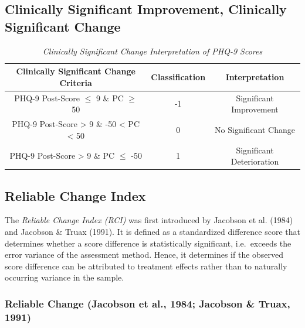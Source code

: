\documentclass[12pt,twoside]{reedthesis}
\begin{document}
\hypertarget{clinically-significant-improvement-clinically-significant-change}{%
\subsection{Clinically Significant Improvement, Clinically Significant Change}\label{clinically-significant-improvement-clinically-significant-change}}
\begin{table}[htb]
\vspace*{1.5em}
\begin{threeparttable}
  \caption{\textit{Clinically Significant Change Interpretation of PHQ-9 Scores}}
  \label{tab:csi-int}
  \begin{tabular}{@{}ccc@{}}
  \toprule
  Clinically Significant Change Criteria & Classification & Interpretation\\ \midrule
  PHQ-9 Post-Score $\leq$ 9 \& PC $\geq$ 50 & -1 & Significant Improvement\\
  PHQ-9 Post-Score > 9 \& -50 < PC < 50 & 0 & No Significant Change\\
  PHQ-9 Post-Score > 9 \& PC $\leq$ -50 & 1 & Significant Deterioration\\
  \bottomrule
  \end{tabular}
\end{threeparttable}
\end{table}
\hypertarget{reliable-change-index}{%
\subsection{Reliable Change Index}\label{reliable-change-index}}

The \emph{Reliable Change Index (RCI)} was first introduced by Jacobson et al. (1984) and Jacobson \& Truax (1991). It is defined as a standardized difference score that determines whether a score difference is statistically significant, i.e.~exceeds the error variance of the assessment method. Hence, it determines if the observed score difference can be attributed to treatment effects rather than to naturally occurring variance in the sample.

\par

\par

\hypertarget{reliable-change-jacobson.1984-jacobson.1991}{%
\subsubsection{Reliable Change (Jacobson et al., 1984; Jacobson \& Truax, 1991)}\label{reliable-change-jacobson.1984-jacobson.1991}}
\end{document}
